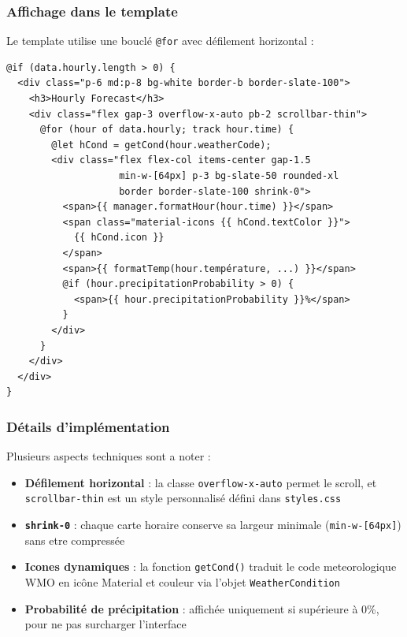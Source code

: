 \documentclass[12pt,a4paper]{article}
\begin{document}
\subsubsection{Affichage dans le template}

Le template utilise une bouclé \texttt{@for} avec défilement horizontal :

\begin{lstlisting}[style=angular, caption={Template du bloc des prévisions horaires}]
@if (data.hourly.length > 0) {
  <div class="p-6 md:p-8 bg-white border-b border-slate-100">
    <h3>Hourly Forecast</h3>
    <div class="flex gap-3 overflow-x-auto pb-2 scrollbar-thin">
      @for (hour of data.hourly; track hour.time) {
        @let hCond = getCond(hour.weatherCode);
        <div class="flex flex-col items-center gap-1.5
                    min-w-[64px] p-3 bg-slate-50 rounded-xl
                    border border-slate-100 shrink-0">
          <span>{{ manager.formatHour(hour.time) }}</span>
          <span class="material-icons {{ hCond.textColor }}">
            {{ hCond.icon }}
          </span>
          <span>{{ formatTemp(hour.température, ...) }}</span>
          @if (hour.precipitationProbability > 0) {
            <span>{{ hour.precipitationProbability }}%</span>
          }
        </div>
      }
    </div>
  </div>
}
\end{lstlisting}

\subsubsection{Détails d'implémentation}

Plusieurs aspects techniques sont a noter :

\begin{itemize}[nosep]
    \item \textbf{Défilement horizontal} : la classe \texttt{overflow-x-auto} permet le scroll, et \texttt{scrollbar-thin} est un style personnalisé défini dans \texttt{styles.css}
    \item \textbf{\texttt{shrink-0}} : chaque carte horaire conserve sa largeur minimale (\texttt{min-w-[64px]}) sans etre compressée
    \item \textbf{Icones dynamiques} : la fonction \texttt{getCond()} traduit le code meteorologique WMO en icône Material et couleur via l'objet \texttt{WeatherCondition}
    \item \textbf{Probabilité de précipitation} : affichée uniquement si supérieure à 0\%, pour ne pas surcharger l'interface
\end{itemize}
\end{document}
